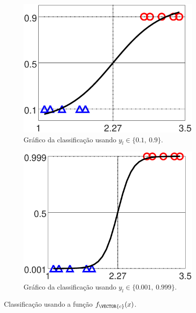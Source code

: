 \begin{figure}[!h]
    \begin{subfigure}[b]{0.45\textwidth}
        \centering
        \includegraphics[width=\textwidth]{chapters/classificacao/mfiles/reglogr1r1/ex1s1-reglogr1r1.eps}
        \caption{Gráfico da classificação usando $y_l \in \{0.1,~ 0.9\}$.}
        \label{fig:theo:reglogr1r1:xn:s1}
    \end{subfigure}
    \hfill
    \begin{subfigure}[b]{0.45\textwidth}
        \centering
        \includegraphics[width=\textwidth]{chapters/classificacao/mfiles/reglogr1r1/ex1s2-reglogr1r1.eps}
        \caption{Gráfico da classificação usando $y_l \in \{0.001,~ 0.999\}$.}
        \label{fig:theo:reglogr1r1:xn:s2}
    \end{subfigure}
    \caption{Classificação usando a função $f_{\VECTOR{c}}(x)$.}
    \label{fig:theo:reglogr1r1:xn}
\end{figure}


